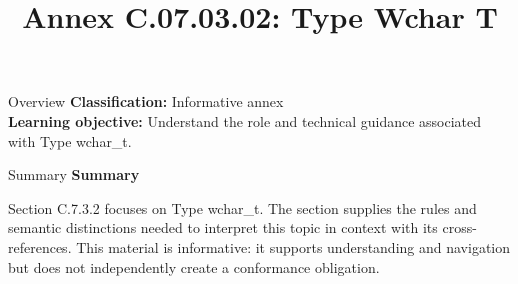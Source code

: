 \documentclass[10pt,letterpaper]{article}
\title{Annex C.07.03.02: Type Wchar T}
\author{}
\date{}
\begin{document}
\maketitle
\begin{CornellOverviewBox}{Overview}
\textbf{Classification:} Informative annex\\[2pt]
\textbf{Learning objective:} Understand the role and technical guidance associated with Type wchar\_t.
\end{CornellOverviewBox}\begin{CornellSummaryBox}{Summary}
{\sffamily\bfseries\color{Accent} Summary}\par\vspace{3pt}Section C.7.3.2 focuses on Type wchar\_t. The section supplies the rules and semantic distinctions needed to interpret this topic in context with its cross-references. This material is informative: it supports understanding and navigation but does not independently create a conformance obligation.
\end{CornellSummaryBox}
\end{document}
